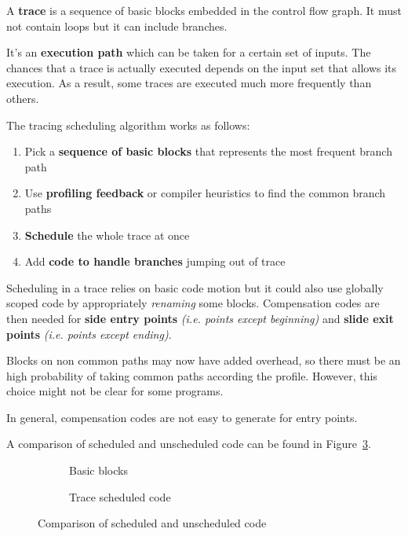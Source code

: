 \documentclass[english]{article}
\begin{document}
\bigskip
A \textbf{trace} is a sequence of basic blocks embedded in the control flow graph.
It must not contain loops but it can include branches.

It's an \textbf{execution path} which can be taken for a certain set of inputs.
The chances that a trace is actually executed depends on the input set that allows its execution.
As a result, some traces are executed much more frequently than others.

The tracing scheduling algorithm works as follows:

\begin{enumerate}
  \item Pick a \textbf{sequence of basic blocks} that represents the most frequent branch path
  \item Use \textbf{profiling feedback} or compiler heuristics to find the common branch paths
  \item \textbf{Schedule} the whole trace at once
  \item Add \textbf{code to handle branches} jumping out of trace
\end{enumerate}

Scheduling in a trace relies on basic code motion but it could also use globally scoped code by appropriately \textit{renaming} some blocks.
Compensation codes are then needed for \textbf{side entry points} \textit{(i.e. points except beginning)} and \textbf{slide exit points} \textit{(i.e. points except ending)}.

Blocks on non common paths may now have added overhead, so there must be an high probability of taking common paths according the profile.
However, this choice might not be clear for some programs.

In general, compensation codes are not easy to generate for entry points.

\bigskip
A comparison of scheduled and unscheduled code can be found in Figure~\ref{fig:compare-scheduled-unscheduled-code}.

\begin{figure}[htbp]
  \bigskip
  \centering

  \begin{subfigure}[b]{0.495\textwidth}
    \centering
    \caption{Basic blocks}
    \label{fig:basic-blocks}
  \end{subfigure}
  \begin{subfigure}[b]{0.495\textwidth}
    \centering
    \caption{Trace scheduled code}
    \label{fig:trace-scheduled-code}
  \end{subfigure}
  \caption{Comparison of scheduled and unscheduled code}
  \label{fig:compare-scheduled-unscheduled-code}
  \bigskip
\end{figure}
\end{document}
